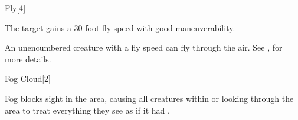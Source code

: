 \begin{spellsection}{Fly}[4]
    \begin{spellheader}
    \end{spellheader}
    \begin{spellcontent}
        \begin{spelltargetinginfo}
        \end{spelltargetinginfo}
        \begin{spelleffects}
            \spelleffect The target gains a 30 foot fly speed with good maneuverability.
            \spelldur \durshort
        \end{spelleffects}
    \end{spellcontent}
    \begin{spellfooter}
        \spellnotes An unencumbered creature with a fly speed can fly through the air. See , for more details.
        \miscastexplode
    \end{spellfooter}%
\end{spellsection}

\begin{spellsection}{Fog Cloud}[2]
    \begin{spellheader}
    \end{spellheader}
    \begin{spellcontent}
        \begin{spelltargetinginfo}
        \end{spelltargetinginfo}
        \begin{spelleffects}
            \spelleffect Fog blocks sight in the area, causing all creatures within or looking through the area to treat everything they see as if it had \concealment.
            \spelldur \durshort
        \end{spelleffects}
    \end{spellcontent}
    \begin{spellfooter}
        \spellnotes \fogspellnotes \fogwindspellnotes

        \physicalspellnotes
        \miscastyou
    \end{spellfooter}
\end{spellsection}

